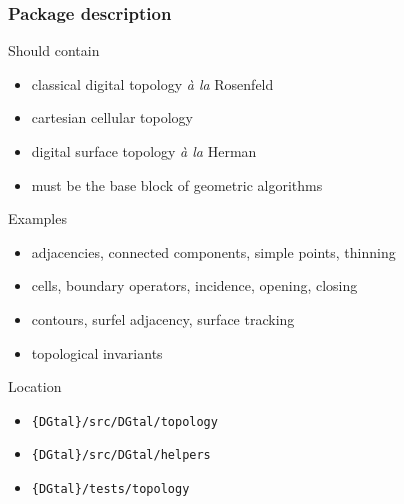 \documentclass[pdftex,francais]{beamer}
\newenvironment{myblocklbluish}[2]%
	       {\begin{beamerboxesrounded}[lower=qcolorlb,upper=qcolorulb,width=#1,shadow=true]{#2}}{\end{beamerboxesrounded}}
\newenvironment{myblocklgreenish}[2]%
	       {\begin{beamerboxesrounded}[lower=qcolorlg,upper=qcolorulg,width=#1,shadow=true]{#2}}{\end{beamerboxesrounded}}
\newenvironment{myblocklredish}[2]%
	       {\begin{beamerboxesrounded}[lower=qcolorlr,upper=qcolorulr,width=#1,shadow=true]{#2}}{\end{beamerboxesrounded}}
\begin{document}
\begin{frame}[squeeze]%
  \frametitle{Package description}

  \begin{myblocklbluish}{\textwidth}{Should contain}
    \begin{itemize}
      \small
    \item classical digital topology {\em à la} Rosenfeld
    \item cartesian cellular topology
    \item digital surface topology {\em à la} Herman
    \item must be the base block of geometric algorithms
    \end{itemize}
  \end{myblocklbluish}
  \begin{myblocklgreenish}{\textwidth}{Examples}
    \begin{itemize}
      \small
    \item adjacencies, connected components, simple points, thinning
    \item cells, boundary operators, incidence, opening, closing
    \item contours, surfel adjacency, surface tracking
    \item topological invariants
    \end{itemize}
  \end{myblocklgreenish}
  \begin{myblocklredish}{\textwidth}{Location}
    \begin{itemize}
      \small
    \item \texttt{\{DGtal\}/src/DGtal/topology}
    \item \texttt{\{DGtal\}/src/DGtal/helpers}
    \item \texttt{\{DGtal\}/tests/topology}
    \end{itemize}
  \end{myblocklredish}

\end{frame}
\end{document}
